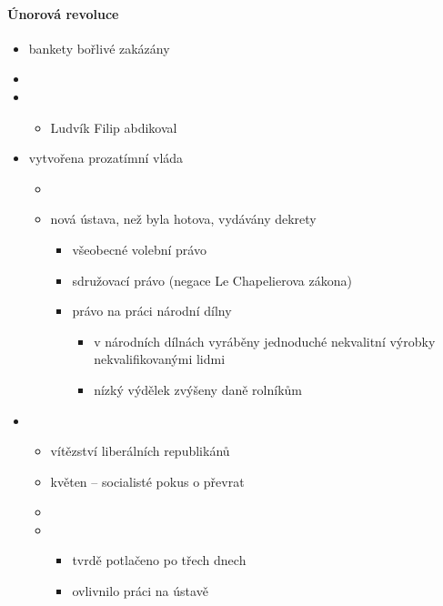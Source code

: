\paragraph{Únorová revoluce}
\begin{itemize}
\item bankety bořlivé \ra zakázány
\item {}
\item {}
	\begin{itemize}
	\item[\ra]Ludvík Filip abdikoval
	\end{itemize}
\item vytvořena prozatímní vláda
	\begin{itemize}
	\item {}
	\item nová ústava, než byla hotova, vydávány dekrety
		\begin{itemize}
		\item všeobecné volební právo
		\item sdružovací právo (negace Le Chapelierova zákona)
		\item právo na práci \ra národní dílny 
			\begin{itemize}
			\item v národních dílnách vyráběny jednoduché nekvalitní výrobky nekvalifikovanými lidmi
			\item nízký výdělek \ra zvýšeny daně rolníkům

			\end{itemize}
		\end{itemize}
	\end{itemize}
\item {}
	\begin{itemize}
	\item vítězství liberálních republikánů
	\item květen -- socialisté pokus o převrat
	\item {}
	\item {}
		\begin{itemize}
		\item tvrdě potlačeno po třech dnech
		\item ovlivnilo práci na ústavě \ra 
		\end{itemize}
	\end{itemize}
\end{itemize}

